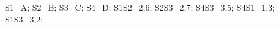 \documentclass[exercice]{thedocument}%
\begin{document}
%
    \>S1=A;%
    \>S2=B;%
    \>S3=C;%
    \>S4=D;%
    \>S1S2=2,6;%
    \>S2S3=2,7;%
    \>S4S3=3,5;%
    \>S4S1=1,3;%
    \>S1S3=3,2;%
\end{document}
